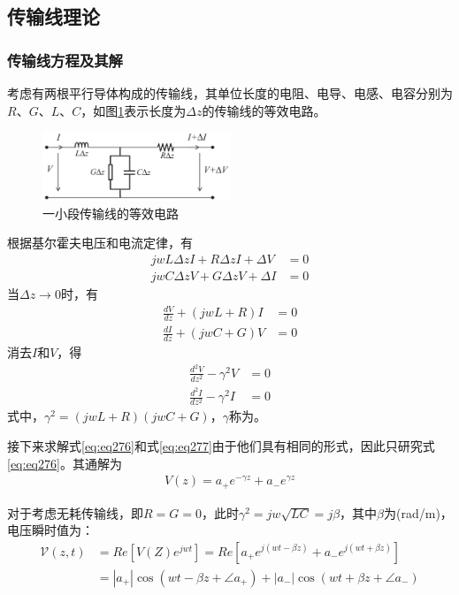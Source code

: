 \documentclass{article}
\numberwithin{equation}{section}
\begin{document}
\subsection{传输线理论}
\subsubsection{传输线方程及其解}
考虑有两根平行导体构成的传输线，其单位长度的电阻、电导、电感、电容分别为$R$、$G$、$L$、$C$，如图\ref{fig:fig36}表示长度为$\Delta z$的传输线的等效电路。
\begin{figure}[ht]
    \centering
    \includegraphics[width=0.5\textwidth]{一小段传输线的等效电路.PNG}
    \caption{一小段传输线的等效电路}
    \label{fig:fig36}
\end{figure}
\par
根据基尔霍夫电压和电流定律，有
\begin{align}
    \label{eq:eq272}
    jwL\Delta zI+R\Delta zI+\Delta V&=0 \\
    \label{eq:eq273}
    jwC\Delta zV+G\Delta zV+\Delta I&=0
\end{align}
当$\Delta z\to 0$时，有
\begin{align}
    \label{eq:eq274}
    \frac{dV}{dz}+(jwL+R)I&=0 \\
    \label{eq:eq275}
    \frac{dI}{dz}+(jwC+G)V&=0
\end{align}
消去$I$和$V$，得
\begin{align}
    \label{eq:eq276}
    \frac{d^2V}{dz^2}-\gamma^2V&=0 \\
    \label{eq:eq277}
    \frac{d^2I}{dz^2}-\gamma^2I&=0
\end{align}
式中，$\gamma^2=(jwL+R)(jwC+G)$，$\gamma$称为\textbf{\color{blue}{传播常数}}。
\par
接下来求解式\ref{eq:eq276}和式\ref{eq:eq277}由于他们具有相同的形式，因此只研究式\ref{eq:eq276}。其通解为
\begin{align}
    \label{eq:eq278}
    V(z)=a_+e^{-\gamma z}+a_-e^{\gamma z}
\end{align}
\par
对于考虑无耗传输线，即$R=G=0$，此时$\gamma^2=jw\sqrt{LC}=j\beta$，其中$\beta$为\textbf{\color{blue}{相位常数}}(rad/m)，电压瞬时值为：
\begin{align}
    \label{eq:eq279}
    \mathcal{V}(z,t)&=Re\left[V(Z)e^{jwt}\right]=Re\left[a_+e^{j(wt-\beta z)}+a_-e^{j(wt+\beta z)}\right] \nonumber \\
                    &=|a_+|\cos(wt-\beta z+\angle a_+)+|a_-|\cos(wt+\beta z+\angle a_-)
\end{align}
\end{document}
